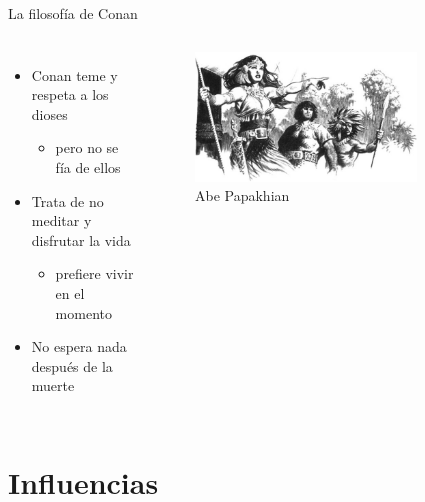 \begin{frame}{La filosofía de Conan}
	\begin{columns}
		\begin{itemize}
			\item Conan teme y respeta a los dioses
			\begin{itemize}
				\item pero no se fía de ellos
			\end{itemize}
			\item Trata de no meditar y disfrutar la vida
			\begin{itemize}
				\item prefiere vivir en el momento
			\end{itemize}
			\item No espera nada después de la muerte
		\end{itemize}
		\begin{figure}[htb]
			\centering
			\includegraphics[width=0.8\textwidth]{img/tributos/elephant07}
			\caption{Abe Papakhian}
		\end{figure}
	\end{columns}
\end{frame}
\note[itemize]{
	\item
}

\section{Influencias}
\note[itemize]{
	\item
}

